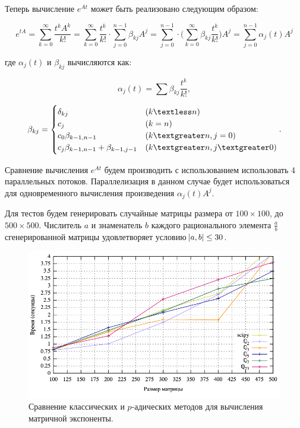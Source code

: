 \documentclass[master, och, diploma, times]{sty/SCWorks}
\theoremstyle{plain}
\theoremstyle{definition}
\numberwithin{equation}{section}
\begin{document}
\noindent Теперь вычисление $e^{At}$ может быть реализовано следующим образом:


\begin{equation}
e^{tA}=\sum\limits_{k=0}^{\infty} \frac{t^kA^k}{k!}=\sum\limits_{k=0}^{\infty} \frac{t^k}{k!} \cdot \sum\limits_{j=0}^{n-1} \beta_{kj} A^j = \sum\limits_{j=0}^{n-1} \cdot \bigg(\sum\limits_{k=0}^{\infty} \beta_{kj} \frac{t^k}{k!} \bigg) A^j = \sum\limits_{j=0}^{n-1} \alpha_{j}(t)A^j
\end{equation}

\noindent где $\alpha_{j}(t)$ и $\beta_{kj}$ вычисляются как:

\begin{equation}
\alpha_{j}(t)=\sum \beta_{kj} \frac{t^k}{k!},
\end{equation}

\begin{equation}
\beta_{kj} = \begin{cases} 
\delta_{kj} & (k \textless n) \\
c_j & (k = n) \\
c_0 \beta_{k-1,n-1} & (k \textgreater n, j=0) \\
c_j \beta_{k-1,n-1}+\beta_{k-1,j-1} & (k \textgreater n, j \textgreater 0)
\end{cases}.
\end{equation}


Сравнение вычисления $e^{At}$ будем производить с использованием использовать 4 параллельных потоков. Параллелизация в данном случае будет использоваться для одновременного вычисления произведения $\alpha_{j}(t)A^j$.

Для тестов будем генерировать случайные матрицы размера от \mbox{$100 \times 100$}, до \mbox{$500 \times 500$}. Числитель $a$ и знаменатель $b$ каждого рационального элемента $\frac{a}{b}$ сгенерированной матрицы удовлетворяет условию $\abs{a,b} \leq 30$.

\begin{figure}[H]
\centerline{\includegraphics[width=0.85\linewidth]{../gnuplot/exp/plot.png}}
\caption{Сравнение классических и $p$-адических методов для вычисления матричной экспоненты.}
\label{img:exp:plot}
\end{figure}
\end{document}

